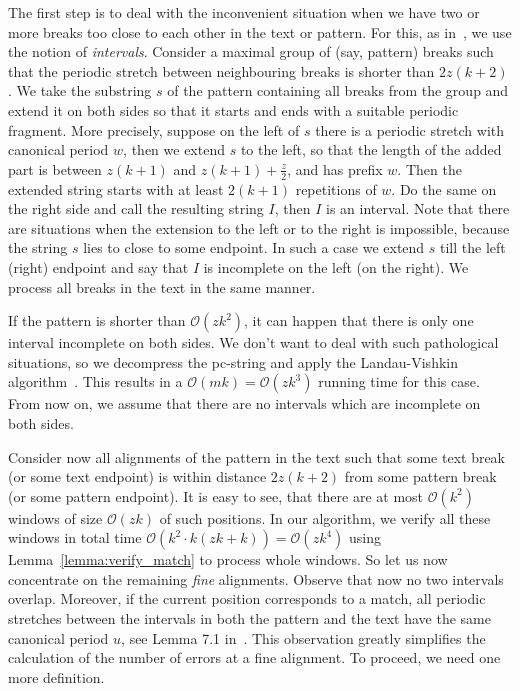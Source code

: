 \documentclass[runningheads]{llncs}
\begin{document}
The first step is to deal with the inconvenient situation when we have two or more breaks too close to each other in the text or pattern. For this, as in~\cite{ColeHariharan}, we use the notion of {\it intervals}. Consider a maximal group of (say, pattern) breaks such that the periodic stretch between neighbouring breaks is shorter than $2z(k+2)$. We take the substring $s$ of the pattern containing all breaks from the group and extend it on both sides so that it starts and ends with a suitable periodic fragment. More precisely, suppose on the left of $s$ there is a periodic stretch with canonical period $w$, then we extend $s$ to the left, so that the length of the added part is between $z(k+1)$ and $z(k+1)+\frac{z}{2}$, and has prefix $w$. Then the extended string starts with at least $2(k+1)$ repetitions of $w$. Do the same on the right side and call the resulting string $I$, then $I$ is an interval. Note that there are situations when the extension to the left  or to the right is impossible, because the string $s$ lies to close to some endpoint. In such a case we extend $s$ till the left (right) endpoint and say that $I$ is incomplete on the left (on the right). We process all breaks in the text in the same manner.

If the pattern is shorter than $\mathcal{O}(zk^2)$, it can happen that there is only one interval incomplete on both sides. We don't want to deal with such pathological situations, so we decompress the pc-string and apply the Landau-Vishkin algorithm~\cite{Landau}. This results in a $\mathcal{O}(mk)=\mathcal{O}(zk^{3})$ running time for this case. From now on, we assume that there are no intervals which are incomplete on both sides.

Consider now all alignments of the pattern in the text such that some text break (or some text endpoint) is within distance $2z(k+2)$ from some pattern break (or some pattern endpoint). It is easy to see, that there are at most $\mathcal{O}(k^2)$ windows of size $\mathcal{O}(zk)$ of such positions. In our algorithm, we verify all these windows in total time $\mathcal{O}(k^2\cdot k(zk+k))=\mathcal{O}(zk^4)$ using Lemma~\ref{lemma:verify_match} to process whole windows. So let us now concentrate on the remaining {\it fine} alignments. Observe that now no two intervals overlap. Moreover, if the current position corresponds to a match, all periodic stretches between the intervals in both the pattern and the text have the same canonical period $u$, see Lemma 7.1 in~\cite{ColeHariharan}. This observation greatly simplifies the calculation of the number of errors at a fine alignment. To proceed, we need one more definition.
\end{document}
